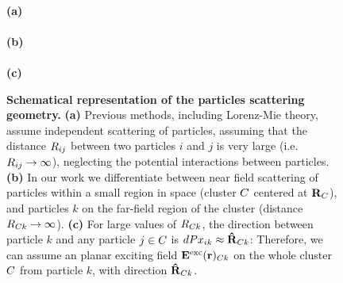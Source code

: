 \begin{figure}[h!]
	\centering
	\def\svgwidth{.5\textwidth}
	 \\ [8pt]  
	\textbf{(a)} \\
	\def\svgwidth{.5\textwidth}
	 \\ [-5pt]
	\textbf{(b)} \\ [5pt]
	\def\svgwidth{.5\textwidth}
	 \\ [-5pt]
	\textbf{(c)}
	
	\caption[Schematical representation of the particles scattering geometry]{\label{fig:waveoptics:diagram}
	  	\textbf{Schematical representation of the particles scattering geometry.} \textbf{(a)} Previous methods, including Lorenz-Mie theory, assume independent scattering of particles, assuming that the distance $R_{ij}$ between two particles $i$ and $j$ is very large (i.e. $R_{ij}\rightarrow\infty$), neglecting the potential interactions between particles. \textbf{(b)} In our work  we differentiate between near field scattering of particles within a small region in space (cluster $C$ centered at $\mathbf{R}_C$), and particles $k$ on the far-field region of the cluster (distance $R_{C k}\rightarrow\infty$). \textbf{(c)} For large values of $R_{C k}$, the direction between particle $k$ and any particle $j\in C$ is $dPx_{ik}\approx\mathbf{\hat{R}}_{C k}$: Therefore, we can assume an planar exciting field $\mathbf{E}^\text{exc}(\mathbf{r})_{C k}$ on the whole cluster $C$ from particle $k$, with direction $\mathbf{\hat{R}}_{C k}$. 
	}
\end{figure}